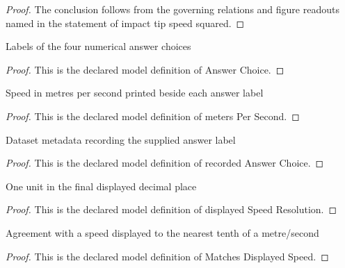 \begin{proof}
  The conclusion follows from the governing relations and figure readouts named in the statement of impact tip speed squared.
\end{proof}
\begin{definition}
  \label{def:physics:phyx-mini-0699:phyxminiproblems-problemphyxmini0699-answerchoice}
  Labels of the four numerical answer choices
\end{definition}
\begin{proof}
  This is the declared model definition of Answer Choice.
\end{proof}
\begin{definition}
  \label{def:physics:phyx-mini-0699:phyxminiproblems-problemphyxmini0699-answerchoice-meterspersecond}
  Speed in metres per second printed beside each answer label
\end{definition}
\begin{proof}
  This is the declared model definition of meters Per Second.
\end{proof}
\begin{definition}
  \label{def:physics:phyx-mini-0699:phyxminiproblems-problemphyxmini0699-recordedanswerchoice}
  Dataset metadata recording the supplied answer label
\end{definition}
\begin{proof}
  This is the declared model definition of recorded Answer Choice.
\end{proof}
\begin{definition}
  \label{def:physics:phyx-mini-0699:phyxminiproblems-problemphyxmini0699-displayedspeedresolution}
  One unit in the final displayed decimal place
\end{definition}
\begin{proof}
  This is the declared model definition of displayed Speed Resolution.
\end{proof}
\begin{definition}
  \label{def:physics:phyx-mini-0699:phyxminiproblems-problemphyxmini0699-matchesdisplayedspeed}
  Agreement with a speed displayed to the nearest tenth of a metre/second
\end{definition}
\begin{proof}
  This is the declared model definition of Matches Displayed Speed.
\end{proof}
